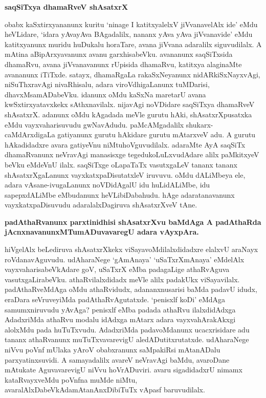 \eject

{\noindent
{\large\bf saqSiTxya dhamaRveV shAsatxrX}}
\medskip

\noindent
obabx kaSxtirxyananunx kuritu `ninage I katitxyalelxV jiVvanavelAlx ide' eMdu heVLidare, `idara yAva\-yAva BAgadalilx, nananx yAva yAva jiVvanavide' eMdu katitxyanunx muridu huDukalu horaTare, avana jiVvana adaralilx siguvudilalx. A mAtina aBipArxyavanunx avanu garxhisabeVku. avananunx saqSiTxsida dhamaRvu, avana jiVvanavanunx rUpisida dhamaRvu, katitxya alaginaMte avananunx iTiTxde. satayx, dhamaRgaLa rakaSxNeyanunx nidARkiSxNayxvAgi, niSuThxravAgi nivaRhisalu, adara viroVdhigaLanunx tuMDarisi, dhavxMsamADa\-beVku. idanunx oMdu kaSxNa maretarU avana kwSxtirxyatavxkekx sAthxnavilalx. nijavAgi noVDidare saqSiTxya dhamaRveV shAsatxrX. adanunx oMdu kAgadada meVle gurutu hAki, shAsatxrXpusatxka eMdu vayxvaharisuvudu gwNa\-vAdudu. paMcAMgadalilx shukarx-caMdArxdigaLa gatiyanunx gurutu hAkidare gurutu mAtarxveV adu. A gurutu hAkadidadxre avara gatiyeVnu niMtuhoVguvudilalx. adaraMte AyA saqSiTx dhamaRvanunx neVra\-vAgi manasisxge tegedukoLuLxvudAdare alilx paMkitxyeV beVku eMdeVnU ilalx. saqSiTxge oLapaTaTx vasutxgaLeV tananx tananx shAsatxrXgaLanunx vayxkatxpaDisutatxleV iruvuvu. oMdu dALiMbeya ele, adara vAsane-ivugaLanunx noVDi\-dAgalU idu huLidALiMbe, idu sapepxdALiMbe eMbudanunx heVLibiDabahudu. hAge adaratana\-vanunx vayxkatxpaDisuvudu adaralalxDagiruva shAsatxrXveV tAne.

{\medskip
\noindent
{\large\bf padAthaRvanunx parxtinidhisi shAsatxrXvu baMdAga A padAthaRda jAcnxnavanunxMTu\-mADuvavaregU adara vAyxpAra.}}\label{page198}                               
\smallskip

\noindent
hiVgelAlx beLediruva shAsatxrXkekx viSayavoMdilalxdidadxre elalxvU araNayx roVdana\-vAgu\-vudu. udAhara\-Nege `gAmAnaya' `uSaTxrXmAnaya' eMdelAlx vayxvaharisabeVkAdare goV, uSaTxrX eMba padagaLige athaR\-vAguva vasutxgaLirabeVku. athaRvilalxdidadx meVle alilx padakUkx viSayavilalx. padAthaRveMdAga oMdu athaRvidudx, adananxnusarisi baMda padavU idudx, eraDara seVruveyiMda padAthaRvAgutatxde. `penisxlf koDi' eMdAga samumxniruvudu yAvAga? penisxlf eMba padada athaRvu ilalxdidAdxga AdadxriMda athaRvu modalu idAdxga mAtarx adara vayxvahArakAkxgi alolxMdu pada huTuTxvudu. AdadxriMda pada\-voMdanunx ucacxrisidare adu tananx athaRvanunx muTuTx\-vavarevigU aledADutitxrutatxde. udAharaNege niVvu poVnf mUlaka yAroV obabxranunx saMpakiRsi mAtanADalu parxyatinxsuvidi. A samayadalilx avareV neVra\-vAgi baMdu, avaroDane mAtukate AguvavarevigU niVvu hoVrADuviri. avaru siga\-didadxrU nimamx kataRvayxveMdu poVnfna muMde niMtu, avaralAlxDabeVkAda\break mAta\-nAnxDibiTuTx vApasf baruvudilalx.


